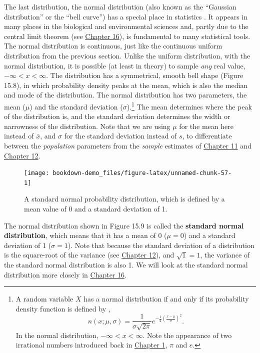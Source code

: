 \documentclass[
  openany]{krantz}
\begin{document}
The last distribution, the normal distribution (also known as the ``Gaussian distribution'' or the ``bell curve'') has a special place in statistics \citep{Miller2004, Navarro2022}.
It appears in many places in the biological and environmental sciences and, partly due to the central limit theorem (see \protect\hyperlink{Chapter_16}{Chapter 16}), is fundamental to many statistical tools.
The normal distribution is continuous, just like the continuous uniform distribution from the previous section.
Unlike the uniform distribution, with the normal distribution, it is possible (at least in theory) to sample \emph{any} real value, \(-\infty < x < \infty\).
The distribution has a symmetrical, smooth bell shape (Figure 15.8), in which probability density peaks at the mean, which is also the median and mode of the distribution.
The normal distribution has two parameters, the mean (\(\mu\)) and the standard deviation (\(\sigma\)).\footnote{A random variable \(X\) has a normal distribution if and only if its probability density function is defined by \citep{Miller2004}, \[n\left(x; \mu, \sigma\right) = \frac{1}{\sigma\sqrt{2\pi}}e^{-\frac{1}{2}\left(\frac{x - \mu}{\sigma}\right)^{2}}.\] In the normal distribution, \(-\infty < x < \infty\). Note the appearance of two irrational numbers introduced back in \protect\hyperlink{Chapter_1}{Chapter 1}, \(\pi\) and \(e\).}
The mean determines where the peak of the distribution is, and the standard deviation determines the width or narrowness of the distribution.
Note that we are using \(\mu\) for the mean here instead of \(\bar{x}\), and \(\sigma\) for the standard deviation instead of \(s\), to differentiate between the \emph{population} parameters from the \emph{sample} estimates of \protect\hyperlink{Chapter_11}{Chapter 11} and \protect\hyperlink{Chapter_12}{Chapter 12}.

\begin{figure}
\texttt{[image: bookdown-demo\_files/figure-latex/unnamed-chunk-57-1]} \caption{A standard normal probability distribution, which is defined by a mean value of 0 and a standard deviation of 1.}\label{fig:unnamed-chunk-57}
\end{figure}

The normal distribution shown in Figure 15.9 is called the \textbf{standard normal distribution}, which means that it has a mean of 0 (\(\mu = 0\)) and a standard deviation of 1 (\(\sigma = 1\)).
Note that because the standard deviation of a distribution is the square-root of the variance (see \protect\hyperlink{Chapter_12}{Chapter 12}), and \(\sqrt{1} = 1\), the variance of the standard normal distribution is also 1.
We will look at the standard normal distribution more closely in \protect\hyperlink{Chapter_16}{Chapter 16}.
\end{document}
